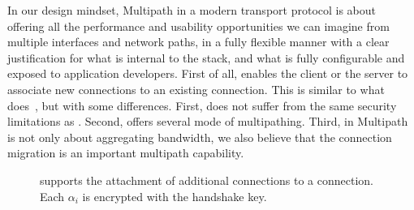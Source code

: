 In our design mindset, Multipath in a modern transport protocol is about
offering all the performance and usability opportunities we can imagine from
multiple interfaces and network paths, in a fully flexible manner with a clear
justification for what is internal to the stack, and what is fully configurable
and exposed to application developers.
First of all, \tcpls enables the client or the server to associate new \tcp connections to an
existing \tcpls connection. This is similar to what \mptcp
does~\cite{raiciu2012hard,rfc6824}, but with some differences. First, \tcpls
does not suffer from the same security limitations as \mptcp.
Second, \tcpls offers several mode of multipathing.
Third, in \tcpls Multipath is not only about aggregating bandwidth, we also
believe that the connection migration is an important multipath capability.


\begin{figure}[!t]
  \centering
  \caption{\tcpls supports the attachment of additional \tcp
    connections to a \tcpls connection. Each $\alpha_i$ is encrypted with the
    handshake key.}
  \label{fig:join-example}
\end{figure}

